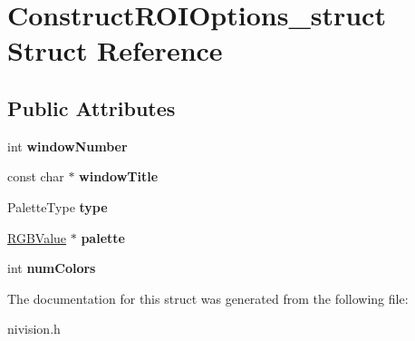 \hypertarget{structConstructROIOptions__struct}{\section{\-Construct\-R\-O\-I\-Options\-\_\-struct \-Struct \-Reference}
\label{structConstructROIOptions__struct}
}
\subsection*{\-Public \-Attributes}
\begin{DoxyCompactItemize}
\item 
\hypertarget{structConstructROIOptions__struct_aa79808d9893ba5ac0b202e00a442938a}{int {\bfseries window\-Number}}\label{structConstructROIOptions__struct_aa79808d9893ba5ac0b202e00a442938a}

\item 
\hypertarget{structConstructROIOptions__struct_ad9fdfb449266ec1b91f56d80818c0dd7}{const char $\ast$ {\bfseries window\-Title}}\label{structConstructROIOptions__struct_ad9fdfb449266ec1b91f56d80818c0dd7}

\item 
\hypertarget{structConstructROIOptions__struct_a37340f2ad3d1405d9983a674e48cdebb}{\-Palette\-Type {\bfseries type}}\label{structConstructROIOptions__struct_a37340f2ad3d1405d9983a674e48cdebb}

\item 
\hypertarget{structConstructROIOptions__struct_a6dbefaa7f7d7335de5988a05b7b9cd66}{\hyperlink{structRGBValue__struct}{\-R\-G\-B\-Value} $\ast$ {\bfseries palette}}\label{structConstructROIOptions__struct_a6dbefaa7f7d7335de5988a05b7b9cd66}

\item 
\hypertarget{structConstructROIOptions__struct_a9b55f0321abbbd79894d843b9e6b6b80}{int {\bfseries num\-Colors}}\label{structConstructROIOptions__struct_a9b55f0321abbbd79894d843b9e6b6b80}

\end{DoxyCompactItemize}


\-The documentation for this struct was generated from the following file\-:\begin{DoxyCompactItemize}
\item 
nivision.\-h\end{DoxyCompactItemize}
